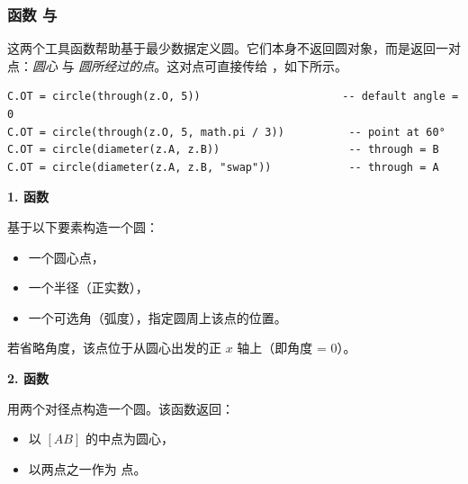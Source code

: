 \vspace{1em}

\begin{tkzexample}[latex=.5\textwidth]
\begin{center}
  \end{center}
\end{tkzexample}


\subsubsection{函数  与 }
\label{ssub:function_code_through_and_code_diameter}

这两个工具函数帮助基于最少数据定义圆。它们本身不返回圆对象，而是返回一对点：\emph{圆心} 与 \emph{圆所经过的点}。这对点可直接传给 ，如下所示。

\begin{mybox}
\begin{verbatim}
C.OT = circle(through(z.O, 5))                      -- default angle = 0
C.OT = circle(through(z.O, 5, math.pi / 3))          -- point at 60°
C.OT = circle(diameter(z.A, z.B))                    -- through = B
C.OT = circle(diameter(z.A, z.B, "swap"))            -- through = A
\end{verbatim}
\end{mybox}

\textbf{1. 函数 \code{through(center, radius, <angle>])}}

基于以下要素构造一个圆：
\begin{itemize}
  \item 一个圆心点，
  \item 一个半径（正实数），
  \item 一个可选角（弧度），指定圆周上该点的位置。
\end{itemize}
若省略角度，该点位于从圆心出发的正 \(x\) 轴上（即角度 = 0）。

\textbf{2. 函数 }

用两个对径点构造一个圆。该函数返回：

\begin{itemize}
  \item 以 \([AB]\) 的中点为圆心，
  \item 以两点之一作为  点。
\end{itemize}

